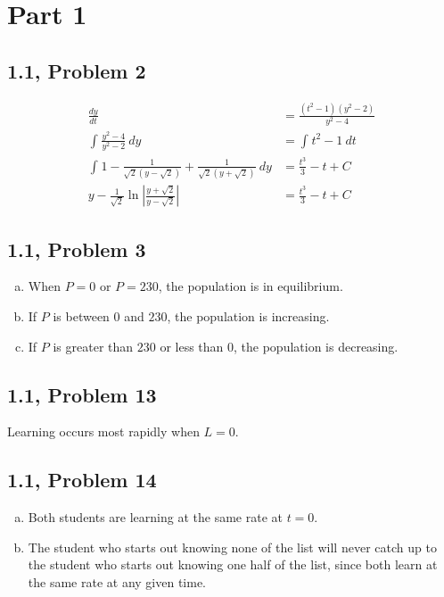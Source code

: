 \documentclass[10pt]{mypackage}
\begin{document}
\section{Part 1}%
\subsection{1.1, Problem 2}%
\begin{align*}
  \frac{dy}{dt} &= \frac{\left(t^2 - 1\right)\left(y^2 - 2\right)}{y^2 - 4}\\
  \int_{}^{} \frac{y^2 - 4}{y^2 - 2}\:dy &= \int_{}^{} t^2 - 1\:dt\\
  \int_{}^{} 1 - \frac{1}{\sqrt{2}\left(y-\sqrt{2}\right)} + \frac{1}{\sqrt{2}\left(y + \sqrt{2}\right)}\:dy &= \frac{t^3 }{3} - t + C\\
  y - \frac{1}{\sqrt{2}}\ln \left\vert \frac{y + \sqrt{2}}{y - \sqrt{2}} \right\vert &= \frac{t^3}{3} - t + C
\end{align*}
\subsection{1.1, Problem 3}%
\begin{enumerate}[(a)]
  \item When $P = 0$ or $P = 230$, the population is in equilibrium.
  \item If $P$ is between $0$ and $230$, the population is increasing.
  \item If $P$ is greater than $230$ or less than $0$, the population is decreasing.
\end{enumerate}
\subsection{1.1, Problem 13}%
Learning occurs most rapidly when $L = 0$.
\subsection{1.1, Problem 14}%
\begin{enumerate}[(a)]
  \item Both students are learning at the same rate at $t=0$.
  \item The student who starts out knowing none of the list will never catch up to the student who starts out knowing one half of the list, since both learn at the same rate at any given time.
\end{enumerate}
\end{document}
